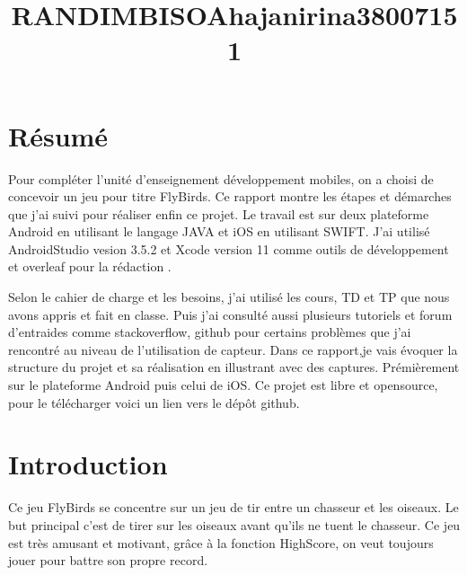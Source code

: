 \documentclass{rapportECL}
\title{RANDIMBISOAhajanirina38007151} %
\begin{document}

\sujet{-} %



        
\fairemarges %
\fairepagedegarde %
\listoffigures  %
\tabledematieres %





\section{Résumé} 

Pour compléter l'unité d'enseignement développement mobiles, on a choisi de concevoir un jeu pour titre FlyBirds. Ce rapport montre les étapes et démarches que j'ai suivi pour réaliser enfin ce projet. Le travail est sur deux plateforme Android en utilisant le langage JAVA et iOS en utilisant SWIFT. J'ai utilisé AndroidStudio\cite{AndroidStudio} vesion 3.5.2 et Xcode\cite{iOS} version 11 comme outils de développement et overleaf pour la rédaction \cite{Overleaf}.

Selon le cahier de charge et les besoins\cite{Cours}, j'ai utilisé les cours, TD et TP que nous avons appris et fait en classe. Puis j'ai consulté aussi plusieurs tutoriels\cite{OpenClassroom} et forum d'entraides comme stackoverflow\cite{Stackoverflow}, github\cite{Github} pour certains problèmes que j'ai rencontré au niveau de l'utilisation de capteur.
Dans ce rapport,je vais évoquer la structure du projet et sa  réalisation en illustrant avec des captures. Prémièrement sur le plateforme Android puis celui de iOS. Ce projet est libre et opensource, pour le télécharger voici un lien vers le dépôt github\cite{Githubd}.



\section{Introduction}
Ce jeu FlyBirds se concentre sur un jeu de tir entre un chasseur et les oiseaux. Le but principal c'est de tirer sur les oiseaux avant qu'ils ne tuent le chasseur. Ce jeu est très amusant et motivant, grâce à la fonction HighScore, on veut toujours jouer pour battre son propre record.
\end{document}
